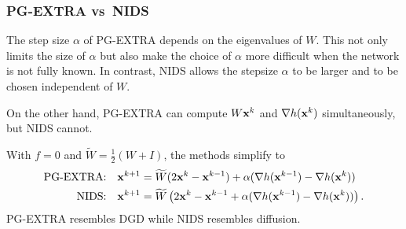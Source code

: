 \documentclass[10pt,mathserif]{beamer}
\begin{document}




\begin{frame}
\frametitle{PG-EXTRA vs\ NIDS}
The step size $\alpha$ of PG-EXTRA depends on the eigenvalues of $W$. This not only limits the size of $\alpha$ but also make the choice of $\alpha$ more difficult when the network is not fully known.
In contrast, NIDS allows the stepsize $\alpha$ to be larger and to be chosen independent of $W$.
\bigskip

On the other hand, PG-EXTRA can compute $W{\mathbf{x}}^k$ and $\nabla h({\mathbf{x}}^k)$ simultaneously, but NIDS cannot.
\bigskip

With $f= 0$ and $\widetilde{W}=\frac{1}{2}(W+I)$, the methods simplify to
\begin{align*}
\text{PG-EXTRA:}&\quad {\mathbf{x}}^{k+1}=\widetilde{W}(2{\mathbf{x}}^k - {\mathbf{x}}^{k-1}) + \alpha(\nabla h({\mathbf{x}}^{k-1})-\nabla h({\mathbf{x}}^k))\\
  \text{NIDS:}&\quad  {\mathbf{x}}^{k+1}=\widetilde{W}\left(2{\mathbf{x}}^k - {\mathbf{x}}^{k-1} + \alpha(\nabla h({\mathbf{x}}^{k-1})-\nabla h({\mathbf{x}}^k))\right).
\end{align*}
PG-EXTRA resembles DGD while NIDS resembles diffusion.


\end{frame}
\end{document}
